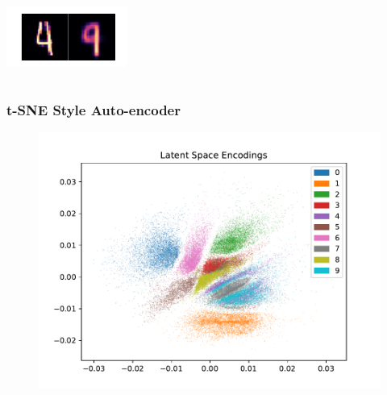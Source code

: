 \documentclass[10pt, usenames, dvipsnames, table]{beamer}
\begin{document}
\begin{frame}
\begin{columns}
    \includegraphics[width=\linewidth]
    {models/mnist_student_e300_L2_b64/reconstruction_5}
  \end{columns}
\end{frame}

\begin{frame}
  \frametitle{t-SNE Style Auto-encoder}
  \begin{figure}
    \centering
    \includegraphics[width=\linewidth]
    {models/mnist_student_e300_L2_b64/encodings}
    \caption{}
    \label{}
  \end{figure}
\end{frame}
\end{document}
